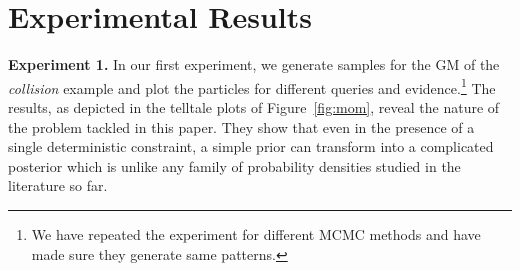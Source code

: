 \documentclass[letterpaper]{article}
\begin{document}

\section{Experimental Results}
\textbf{Experiment 1.} In our first experiment, we generate samples for the GM of the \emph{collision} example and 
plot the particles for different queries and evidence.\footnote{We have repeated the experiment for different 
MCMC methods and have made sure they generate same patterns.}
The results, as depicted in the telltale plots of Figure~\ref{fig:mom}, reveal the nature of the problem tackled in this paper.
They show that even in the presence of a single deterministic constraint, 
a simple prior can transform into a complicated posterior which is unlike any family of 
probability densities studied in the literature so far.
\end{document}
